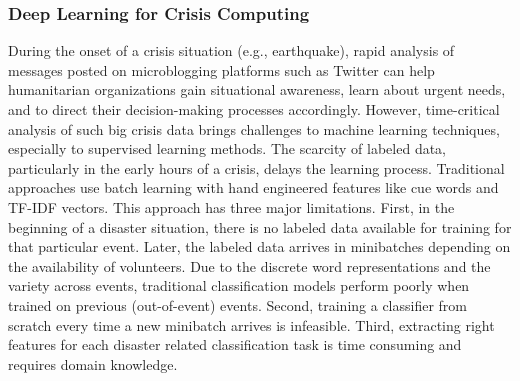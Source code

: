 \documentclass{article} %
\begin{document}


 





\subsubsection{Deep Learning for Crisis Computing}

During the onset of a crisis situation (e.g., earthquake), rapid analysis of messages posted on microblogging platforms such as Twitter can help humanitarian organizations gain situational awareness, learn about urgent needs, and to direct their decision-making processes accordingly. However, time-critical analysis of such big crisis data brings challenges to machine learning techniques, especially to supervised learning methods. The scarcity of labeled data, particularly in the early hours of a crisis, delays the learning process. Traditional approaches use batch learning with hand engineered features like cue words and TF-IDF vectors. This approach has three major limitations. First, in the beginning of a disaster situation, there is no labeled data available for training for that particular event. Later, the labeled data arrives in minibatches depending on the availability of volunteers. Due to the discrete word representations and the variety across events, traditional classification models perform poorly when trained on previous (out-of-event) events. Second, training a classifier from scratch every time a new minibatch arrives is infeasible. Third, extracting right features for each disaster related classification task is time consuming and requires domain knowledge.   
\end{document}
